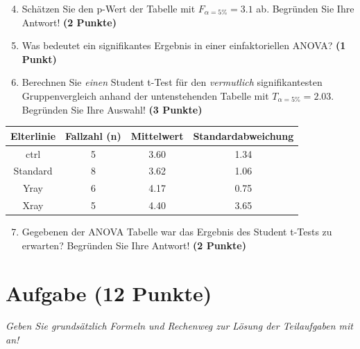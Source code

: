 \documentclass[a4paper, 9pt]{scrartcl}\usepackage[]{graphicx}\usepackage[]{xcolor}
\newenvironment{knitrout}{}{} %
\begin{document}
\vspace{1Ex}

\begin{enumerate}
  \setcounter{enumi}{3}
\item Schätzen Sie den p-Wert der Tabelle mit $F_{\alpha = 5\%} = 3.1$ ab. Begründen Sie Ihre Antwort! \textbf{(2 Punkte)}
\item Was bedeutet ein signifikantes Ergebnis in einer einfaktoriellen ANOVA? \textbf{(1 Punkt)}
\item Berechnen Sie \textit{einen} Student t-Test für den \textit{vermutlich} signifikantesten Gruppenvergleich anhand der untenstehenden Tabelle mit $T_{\alpha = 5\%} = 2.03$. Begründen Sie Ihre Auswahl! \textbf{(3 Punkte)}
\end{enumerate}


\begin{knitrout}
\color{fgcolor}\begin{table}[!h]
\centering\begingroup\fontsize{11}{13}\selectfont

\begin{tabular}{cccc}
\toprule
\textbf{Elterlinie} & \textbf{Fallzahl (n)} & \textbf{Mittelwert} & \textbf{Standardabweichung}\\
\midrule
ctrl & 5 & 3.60 & 1.34\\
Standard & 8 & 3.62 & 1.06\\
Yray & 6 & 4.17 & 0.75\\
Xray & 5 & 4.40 & 3.65\\
\bottomrule
\end{tabular}
\endgroup{}
\end{table}

\end{knitrout}


\begin{enumerate}
  \setcounter{enumi}{6}
\item Gegebenen der ANOVA Tabelle war das Ergebnis des Student t-Tests zu erwarten? Begründen Sie Ihre Antwort! \textbf{(2 Punkte)}
\end{enumerate}

 
\clearpage

\section{Aufgabe \hfill (12 Punkte)}

\textit{Geben Sie grundsätzlich Formeln und Rechenweg zur Lösung der Teilaufgaben mit an!} \\[1Ex]
 
\end{document}
